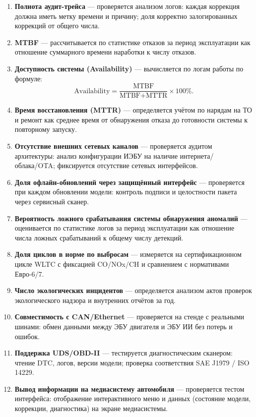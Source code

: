 \documentclass[14pt, a4paper]{extarticle}
\begin{document}
\begin{enumerate}
				\item \textbf{Полнота аудит-трейса} --- проверяется анализом логов: каждая коррекция должна иметь метку времени и причину; доля корректно залогированных коррекций от общего числа.
				
				\item \textbf{MTBF} --- рассчитывается по статистике отказов за период эксплуатации как отношение суммарного времени наработки к числу отказов.
				
				\item \textbf{Доступность системы (Availability)} --- вычисляется по логам работы по формуле:
				\[
				\text{Availability} = \frac{\text{MTBF}}{\text{MTBF} + \text{MTTR}} \times 100\%.
				\]
				
				\item \textbf{Время восстановления (MTTR)} --- определяется учётом по нарядам на ТО и ремонт как среднее время от обнаружения отказа до готовности системы к повторному запуску.
				
				\item \textbf{Отсутствие внешних сетевых каналов} --- проверяется аудитом архитектуры: анализ конфигурации ИЭБУ на наличие интернета/облака/OTA; фиксируется отсутствие сетевых интерфейсов.
				
				\item \textbf{Доля офлайн-обновлений через защищённый интерфейс} --- проверяется при каждом обновлении модели: контроль подписи и целостности пакета через сервисный сканер.
				
				\item \textbf{Вероятность ложного срабатывания системы обнаружения аномалий} --- оценивается по статистике логов за период эксплуатации как отношение числа ложных срабатываний к общему числу детекций.
				
				\item \textbf{Доля циклов в норме по выбросам} --- измеряется на сертификационном цикле WLTC с фиксацией CO/NOx/CH и сравнением с нормативами Евро-6/7.
				
				\item \textbf{Число экологических инцидентов} --- определяется анализом актов проверок экологического надзора и внутренних отчётов за год.
				
				\item \textbf{Совместимость с CAN/Ethernet} --- проверяется на стенде с реальными шинами: обмен данными между ЭБУ двигателя и ЭБУ ИИ без потерь и ошибок.
				
				\item \textbf{Поддержка UDS/OBD-II} --- тестируется диагностическим сканером: чтение DTC, логов, версии модели; проверка соответствия SAE J1979 / ISO 14229.
				
				\item \textbf{Вывод информации на медиасистему автомобиля} --- проверяется тестом интерфейса: отображение интерактивного меню и данных (состояние модели, коррекции, диагностика) на экране медиасистемы.
			\end{enumerate}
			
\end{document}
